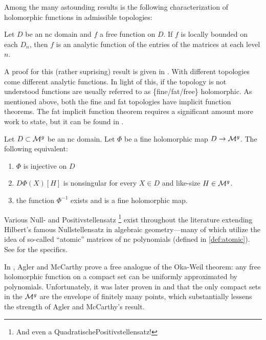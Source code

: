 Among the many astounding results is the following characterization of
holomorphic functions in admissible topologies:
\begin{theorem}
  Let \(D\) be an nc domain and \(f\) a free function on \(D\). If \(f\) is
  locally bounded on each \(D_n\), then \(f\) is an analytic function of the
  entries of the matrices at each level \(n\).
\end{theorem}
A proof for this (rather suprising) result is given in \cite{heltonProper2011}.
With different topologies come different analytic functions. In light of this,
if the topology is not understood functions are usually referred to as
\{fine/fat/free\} holomorphic.
As mentioned above, both the fine and fat topologies have implicit function
theorems. The fat implicit function theorem requires a significant amount more
work to state, but it can be found in \cite{aglerOperator2019}.
\begin{theorem}
  Let \(D \subset \mathcal{M}^g\) be an nc domain. Let \(\Phi\) be a fine holomorphic
  map \(D\to \mathcal{M}^{g} \). The following equivalent:
  \begin{enumerate}
    \item \(\Phi\) is injective on \(D\)
    \item \(D\Phi(X)[H]\) is nonsingular for every \(X \in D\) and like-size
          \(H \in \mathcal{M}^{g}\).
    \item the function \(\Phi ^{-1}\) exists and is a fine holomorphic
          map.
  \end{enumerate}
\end{theorem}

Various Null- and Positivstellensatz
\footnote{And even a QuadratischePositivstellensatz!} exist throughout the
literature extending Hilbert's famous Nullstellensatz in algebraic
geometry---many of which utilize the idea of so-called ``atomic'' matrices of nc
polynomials (defined in \cref{def:atomic}). See \cite{heltonFactorization2019}
for the specifics.

In \cite{aglerGlobal2013}, Agler and McCarthy prove a free analogue of the
Oka-Weil theorem: any free holomorphic function on a compact set
can be uniformly approximated by polynomials. Unfortunately, it was later proven
in \cite{pascoeInvariant2021} and \cite{augatCompact2017} that the only compact
sets in the \(\mathcal{M}^{g} \) are the envelope of finitely many points, which
substantially lessens the strength of
Agler and McCarthy's result.




